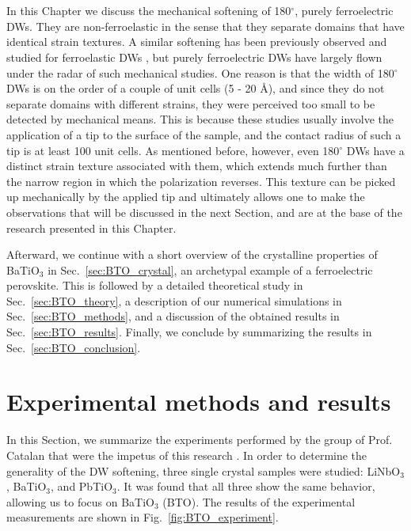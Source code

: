 \\\\
In this Chapter we discuss the mechanical softening of 180$^\circ$, purely ferroelectric DWs. They are non-ferroelastic in the sense that they separate domains that have identical strain textures.
A similar softening has been previously observed and studied for ferroelastic DWs \cite{Lee2003,Scott2012}, but purely ferroelectric DWs have largely flown under the radar of such mechanical studies.
One reason is that the width of 180$^\circ$ DWs is on the order of a couple of unit cells (5 - 20 \AA \cite{Zhirnov1959}), and since they do not separate domains with different strains, they were perceived too small to be detected by mechanical means.
This is because these studies usually involve the application of a tip to the surface of the sample, and the contact radius of such a tip is at least 100 unit cells.
As mentioned before, however, even 180$^\circ$ DWs have a distinct strain texture associated with them, which extends much further than the narrow region in which the polarization reverses.
This texture can be picked up mechanically by the applied tip and ultimately allows one to make the observations that will be discussed in the next Section, and are at the base of the research presented in this Chapter.

Afterward, we continue with a short overview of the crystalline properties of BaTiO$_3$ in Sec.~\ref{sec:BTO_crystal}, an archetypal example of a ferroelectric perovskite.
This is followed by a detailed theoretical study in Sec.~\ref{sec:BTO_theory}, a description of our numerical simulations in Sec.~\ref{sec:BTO_methods}, and a discussion of the obtained results in Sec.~\ref{sec:BTO_results}.
Finally, we conclude by summarizing the results in Sec.~\ref{sec:BTO_conclusion}.

\section{Experimental methods and results}
In this Section, we summarize the experiments performed by the group of Prof. Catalan that were the impetus of this research \cite{Stefani2020}.
In order to determine the generality of the DW softening, three single crystal samples were studied: LiNbO$_3$, BaTiO$_3$, and PbTiO$_3$. It was found that all three show the same behavior, allowing us to focus on BaTiO$_3$ (BTO).
The results of the experimental measurements are shown in Fig.~\ref{fig:BTO_experiment}.

